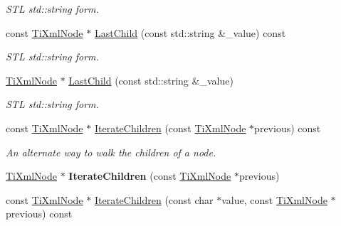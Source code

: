 \begin{DoxyCompactItemize}
\begin{DoxyCompactList}\small\item\em S\+TL std\+::string form. \end{DoxyCompactList}\item 
const \hyperlink{class_ti_xml_node}{Ti\+Xml\+Node} $\ast$ \hyperlink{class_ti_xml_node_a256d0cdbfcfeccae83f3a1c9747a8b63}{Last\+Child} (const std\+::string \&\+\_\+value) const \hypertarget{class_ti_xml_node_a256d0cdbfcfeccae83f3a1c9747a8b63}{}\label{class_ti_xml_node_a256d0cdbfcfeccae83f3a1c9747a8b63}

\begin{DoxyCompactList}\small\item\em S\+TL std\+::string form. \end{DoxyCompactList}\item 
\hyperlink{class_ti_xml_node}{Ti\+Xml\+Node} $\ast$ \hyperlink{class_ti_xml_node_a69772c9202f70553f940b15c06b07be3}{Last\+Child} (const std\+::string \&\+\_\+value)\hypertarget{class_ti_xml_node_a69772c9202f70553f940b15c06b07be3}{}\label{class_ti_xml_node_a69772c9202f70553f940b15c06b07be3}

\begin{DoxyCompactList}\small\item\em S\+TL std\+::string form. \end{DoxyCompactList}\item 
const \hyperlink{class_ti_xml_node}{Ti\+Xml\+Node} $\ast$ \hyperlink{class_ti_xml_node_aaef7ac3978c4bb1cc8a24ffae7bced75}{Iterate\+Children} (const \hyperlink{class_ti_xml_node}{Ti\+Xml\+Node} $\ast$previous) const 
\begin{DoxyCompactList}\small\item\em An alternate way to walk the children of a node. \end{DoxyCompactList}\item 
\hyperlink{class_ti_xml_node}{Ti\+Xml\+Node} $\ast$ {\bfseries Iterate\+Children} (const \hyperlink{class_ti_xml_node}{Ti\+Xml\+Node} $\ast$previous)\hypertarget{class_ti_xml_node_a2358e747118fdbf0e467b1e4f7d03de1}{}\label{class_ti_xml_node_a2358e747118fdbf0e467b1e4f7d03de1}

\item 
const \hyperlink{class_ti_xml_node}{Ti\+Xml\+Node} $\ast$ \hyperlink{class_ti_xml_node_af2b86dbe25d3d26fa48180edc5e2a9fc}{Iterate\+Children} (const char $\ast$value, const \hyperlink{class_ti_xml_node}{Ti\+Xml\+Node} $\ast$previous) const \hypertarget{class_ti_xml_node_af2b86dbe25d3d26fa48180edc5e2a9fc}{}\label{class_ti_xml_node_af2b86dbe25d3d26fa48180edc5e2a9fc}


\end{DoxyCompactItemize}
